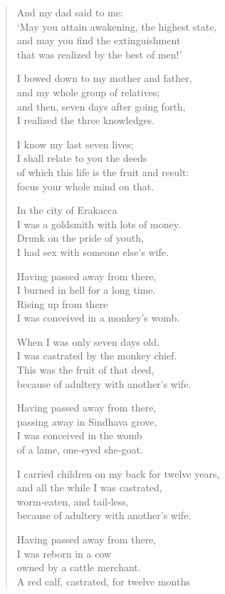 \documentclass[12pt,openany]{book}%
\begin{document}
\begin{verse}
And my dad said to me: \\
‘May you attain awakening, the highest state, \\
and may you find the extinguishment \\
that was realized by the best of men!’ 

I bowed down to my mother and father, \\
and my whole group of relatives; \\
and then, seven days after going forth, \\
I realized the three knowledges. 

I know my last seven lives; \\
I shall relate to you the deeds \\
of which this life is the fruit and result: \\
focus your whole mind on that. 

In the city of Erakacca \\
I was a goldsmith with lots of money. \\
Drunk on the pride of youth, \\
I had sex with someone else’s wife. 

Having passed away from there, \\
I burned in hell for a long time. \\
Rising up from there \\
I was conceived in a monkey’s womb. 

When I was only seven days old, \\
I was castrated by the monkey chief. \\
This was the fruit of that deed, \\
because of adultery with another’s wife. 

Having passed away from there, \\
passing away in Sindhava grove, \\
I was conceived in the womb \\
of a lame, one-eyed she-goat. 

I carried children on my back for twelve years, \\
and all the while I was castrated, \\
worm-eaten, and tail-less, \\
because of adultery with another’s wife. 

Having passed away from there, \\
I was reborn in a cow \\
owned by a cattle merchant. \\
A red calf, castrated, for twelve months 


\end{verse}
\end{document}
